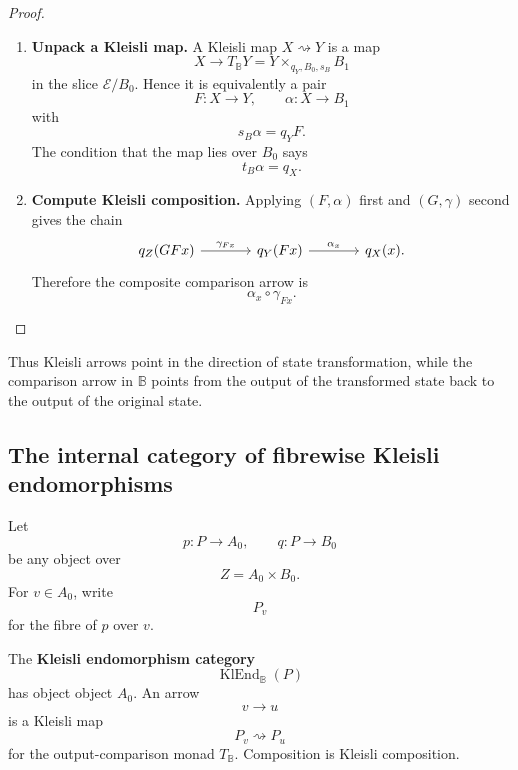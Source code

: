 \begin{proof}
    \leavevmode
    \begin{enumerate}
        \item \textbf{Unpack a Kleisli map.}
        A Kleisli map \(X\rightsquigarrow Y\) is a map
        \[
            X\to T_{\mathbb B}Y
            =
            Y\times_{q_Y,B_0,s_B}B_1
        \]
        in the slice \(\mathcal E/B_0\). Hence it is equivalently a pair
        \[
            F:X\to Y,
            \qquad
            \alpha:X\to B_1
        \]
        with
        \[
            s_B\alpha=q_YF.
        \]
        The condition that the map lies over \(B_0\) says
        \[
            t_B\alpha=q_X.
        \]

        \item \textbf{Compute Kleisli composition.}
        Applying \((F,\alpha)\) first and \((G,\gamma)\) second gives the chain
        \[
        \begin{tikzcd}[column sep=large, row sep=large]
            q_Z(GFx)
                \arrow[r, "\gamma_{Fx}"]
            &
            q_Y(Fx)
                \arrow[r, "\alpha_x"]
            &
            q_X(x).
        \end{tikzcd}
        \]
        Therefore the composite comparison arrow is
        \[
            \alpha_x\circ\gamma_{Fx}.
        \]
    \end{enumerate}
\end{proof}

Thus Kleisli arrows point in the direction of state transformation, while the
comparison arrow in \(\mathbb B\) points from the output of the transformed
state back to the output of the original state.

\subsection{The internal category of fibrewise Kleisli endomorphisms}
\label{subsec:klend-internal-category}

Let
\[
    p:P\to A_0,
    \qquad
    q:P\to B_0
\]
be any object over
\[
    Z=A_0\times B_0.
\]
For \(v\in A_0\), write
\[
    P_v
\]
for the fibre of \(p\) over \(v\).

\begin{definition}
\label{def:klend-coeq-theory}
    The \textbf{Kleisli endomorphism category}
    \[
        \operatorname{KlEnd}_{\mathbb B}(P)
    \]
    has object object \(A_0\). An arrow
    \[
        v\to u
    \]
    is a Kleisli map
    \[
        P_v\rightsquigarrow P_u
    \]
    for the output-comparison monad \(T_{\mathbb B}\). Composition is Kleisli
    composition.
\end{definition}

